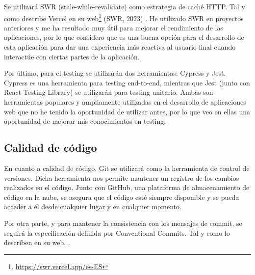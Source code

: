 Se utilizará SWR (stale-while-revalidate) como estrategia de caché HTTP. Tal y como describe Vercel en su web\footnote{\url{https://swr.vercel.app/es-ES}} (SWR, 2023) . He utilizado SWR en proyectos anteriores y me ha resultado muy útil para mejorar el rendimiento de las aplicaciones, por lo que considero que es una buena opción para el desarrollo de esta aplicación para dar una experiencia más reactiva al usuario final cuando interactúe con ciertas partes de la aplicación.

Por último, para el testing se utilizarán dos herramientas: Cypress y Jest. Cypress es una herramienta para testing end-to-end, mientras que Jest (junto con React Testing Library) se utilizarán para testing unitario. Ambas son herramientas populares y ampliamente utilizadas en el desarrollo de aplicaciones web que no he tenido la oportunidad de utilizar antes, por lo que veo en ellas una oportunidad de mejorar mis conocimientos en testing.


\subsection{Calidad de código}

En cuanto a calidad de código, Git se utilizará como la herramienta de control de versiones. Dicha herramienta nos permite mantener un registro de los cambios realizados en el código. Junto con GitHub, una plataforma de almacenamiento de código en la nube, se asegura que el código esté siempre disponible y se pueda acceder a él desde cualquier lugar y en cualquier momento.

Por otra parte, y para mantener la consistencia con los mensajes de commit, se seguirá la especificación definida por Conventional Commits. Tal y como lo describen en su web, .

